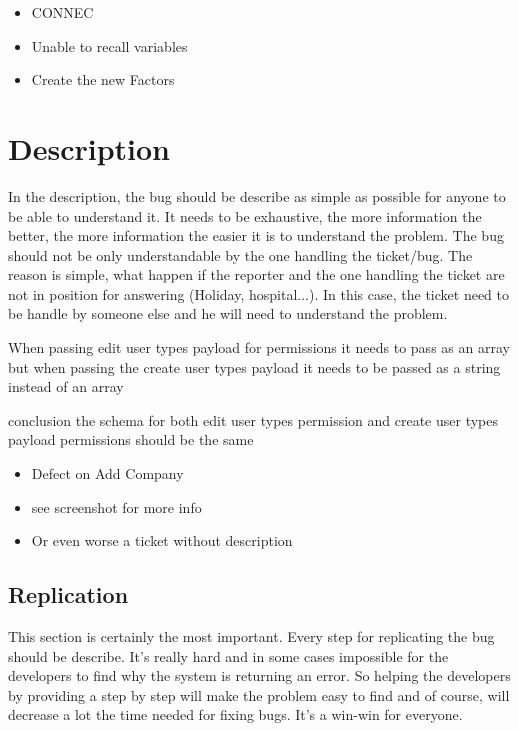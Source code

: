 \documentclass[a4paper,article,oneside]{memoir}
\begin{document}
\begin{itemize}
  \item CONNEC
  \item Unable to recall variables
  \item Create the new Factors
\end{itemize}
	
		
        \chapter{Description}
        In the description, the bug should be describe as simple as possible for anyone to be able to understand it. It needs to be exhaustive, the more information the better, the more information the easier it is to understand the problem. The bug should not be only understandable by the one handling the ticket/bug. The reason is simple, what happen if the reporter and the one handling the ticket are not in position for answering (Holiday, hospital...). In this case, the ticket need to be handle by someone else and he will need to understand the problem.
        
\noindent{}

When passing edit user types payload for permissions it needs to pass as an array but
when passing the create user types payload it needs to be passed as a string instead of an array

conclusion the schema for both edit user types permission and create user types payload permissions should be the same

\noindent{}  

\begin{itemize}
  \item Defect on Add Company
  \item see screenshot for more info
  \item Or even worse a ticket without description
\end{itemize}
     
        \section{Replication}
        This section is certainly the most important. Every step for replicating the bug should be describe. It's really hard and in some cases impossible for the developers to find why the system is returning an error. So helping the developers by providing a step by step will make the problem easy to find and of course, will decrease a lot the time needed for fixing bugs. It's a win-win for everyone.
\end{document}
